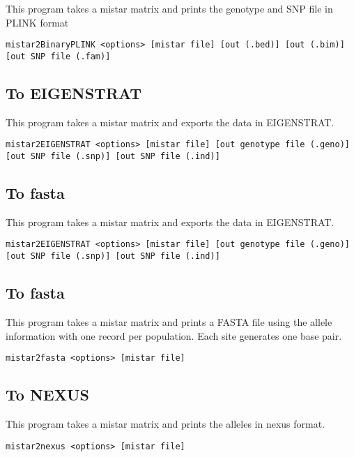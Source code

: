 \documentclass[a4paper]{article}
\begin{document}
This program takes a mistar matrix and prints the genotype and SNP file in PLINK format

\tiny
\begin{verbatim}
mistar2BinaryPLINK <options> [mistar file] [out (.bed)] [out (.bim)] [out SNP file (.fam)]
\end{verbatim}
\normalsize

\subsection{To EIGENSTRAT}
This program takes a mistar matrix and exports the data in EIGENSTRAT.
\tiny
\begin{verbatim}
mistar2EIGENSTRAT <options> [mistar file] [out genotype file (.geno)] [out SNP file (.snp)] [out SNP file (.ind)]
\end{verbatim}
\normalsize

\subsection{To fasta}
This program takes a mistar matrix and exports the data in EIGENSTRAT.
\tiny
\begin{verbatim}
mistar2EIGENSTRAT <options> [mistar file] [out genotype file (.geno)] [out SNP file (.snp)] [out SNP file (.ind)]
\end{verbatim}
\normalsize
\subsection{To fasta}

This program takes a mistar matrix and prints a FASTA file using the allele information with one record per population. Each site generates one base pair.

\begin{verbatim}
mistar2fasta <options> [mistar file] 
\end{verbatim}

\subsection{To NEXUS}

This program takes a mistar matrix and prints the alleles in nexus format.

\begin{verbatim}
mistar2nexus <options> [mistar file]
\end{verbatim}






\newpage





%

\end{document}

